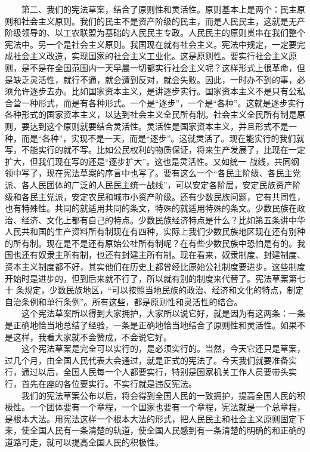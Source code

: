 \documentclass[cn,11pt,chinese]{elegantbook}
\begin{document}
　　第二、我们的宪法草案，结合了原则性和灵活性。原则基本上是两个：民主原则和社会主义原则。我们的民主不是资产阶级的民主，而是人民民主，这就是无产阶级领导的、以工农联盟为基础的人民民主专政。人民民主的原则贯串在我们整个宪法中。另一个是社会主义原则。我国现在就有社会主义。宪法中规定，一定要完成社会主义改造，实现国家的社会主义工业化。这是原则性。要实行社会主义原则，是不是在全国范围内一天早晨一切都实行社会主义呢？这样形式上很革命，但是缺乏灵活性，就行不通，就会遭到反对，就会失败。因此，一时办不到的事，必须允许逐步去办。比如国家资本主义，是讲逐步实行。国家资本主义不是只有公私合营一种形式，而是有各种形式。一个是“逐步”，一个是“各种”。这就是逐步实行各种形式的国家资本主义，以达到社会主义全民所有制。社会主义全民所有制是原则，要达到这个原则就要结合灵活性。灵活性是国家资本主义，并且形式不是一种，而是“各种”，实现不是一天，而是“逐步”。这就灵活了。现在能实行的我们就写，不能实行的就不写。比如公民权利的物质保证，将来生产发展了，比现在一定扩大，但我们现在写的还是“逐步扩大”。这也是灵活性。又如统一 战线，共同纲领中写了，现在宪法草案的序言中也写了。要有这么一个“各民主阶级、各民主党派、各人民团体的广泛的人民民主统一战线”，可以安定各阶层，安定民族资产阶级和各民主党派，安定农民和城市小资产阶级。还有少数民族问题，它有共同性，也有特殊性。共同的就适用共同的条文，特殊的就适用特殊的条文。少数民族在政治、经济、文化上都有自己的特点。少数民族经济特点是什么？比如第五条讲中华人民共和国的生产资料所有制现在有四种，实际上我们少数民族地区现在还有别种的所有制。现在是不是还有原始公社所有制呢？在有些少数民族中恐怕是有的。我国也还有奴隶主所有制，也还有封建主所有制。现在看来，奴隶制度、封建制度、资本主义制度都不好，其实他们在历史上都曾经比原始公社制度要进步。这些制度开始时是进步的，但到后来就不行了，所以就有别的制度来代替了。宪法草案第七十 条规定，少数民族地区，“可以按照当地民族的政治、经济和文化的特点，制定自治条例和单行条例”。所有这些，都是原则性和灵活性的结合。\\
　　这个宪法草案所以得到大家拥护，大家所以说它好，就是因为有这两条：一条是正确地恰当地总结了经验，一条是正确地恰当地结合了原则性和灵活性。如果不是这样，我看大家就不会赞成，不会说它好。\\
　　这个宪法草案是完全可以实行的，是必须实行的。当然，今天它还只是草案，过几个月，由全国人民代表大会通过，就是正式的宪法了。今天我们就要准备实行，通过以后，全国人民每一个人都要实行，特别是国家机关工作人员要带头实行，首先在座的各位要实行。不实行就是违反宪法。\\
　　我们的宪法草案公布以后，将会得到全国人民的一致拥护，提高全国人民的积极性。一个团体要有一个章程，一个国家也要有一个章程，宪法就是一个总章程，是根本大法。用宪法这样一个根本大法的形式，把人民民主和社会主义原则固定下来，使全国人民有一条清楚的轨道，使全国人民感到有一条清楚的明确的和正确的道路可走，就可以提高全国人民的积极性。\\
\end{document}
